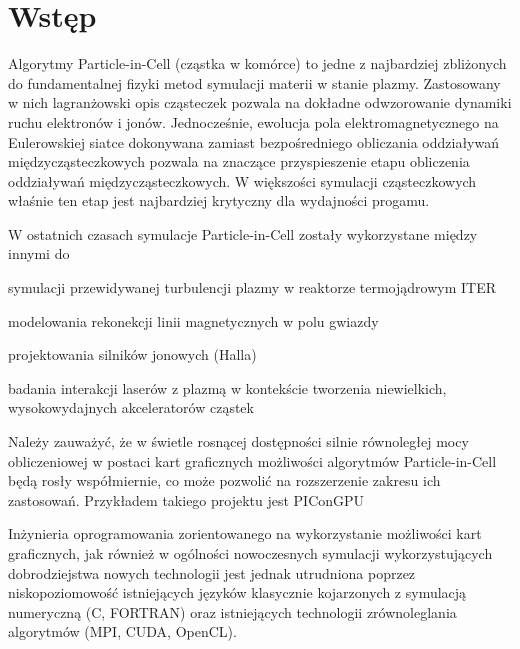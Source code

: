 \newcommand{\code}[1]{\texttt{#1}}

\section[Wstęp]{Wstęp} %
Algorytmy Particle-in-Cell (cząstka w komórce) to jedne z najbardziej zbliżonych do fundamentalnej fizyki
metod symulacji materii w stanie plazmy. Zastosowany w nich lagranżowski opis cząsteczek pozwala na dokładne
odwzorowanie dynamiki ruchu elektronów i jonów. Jednocześnie, ewolucja pola elektromagnetycznego na Eulerowskiej
siatce dokonywana zamiast bezpośredniego obliczania oddziaływań międzycząsteczkowych pozwala na znaczące
przyspieszenie etapu obliczenia oddziaływań międzycząsteczkowych. W większości symulacji cząsteczkowych właśnie
ten etap jest najbardziej krytyczny dla wydajności progamu.

W ostatnich czasach symulacje Particle-in-Cell zostały wykorzystane między innymi do
\item symulacji przewidywanej turbulencji plazmy w reaktorze termojądrowym ITER 
\item modelowania rekonekcji linii magnetycznych w polu gwiazdy 
\item projektowania silników jonowych (Halla) 
\item badania interakcji laserów z plazmą w kontekście tworzenia niewielkich,
    wysokowydajnych akceleratorów cząstek 

    Należy zauważyć, że w świetle rosnącej dostępności silnie równoległej mocy obliczeniowej w postaci kart graficznych
    możliwości algorytmów Particle-in-Cell będą rosły współmiernie, co może pozwolić na rozszerzenie zakresu ich zastosowań.
    Przykładem takiego projektu jest PIConGPU 

    Inżynieria oprogramowania zorientowanego na wykorzystanie możliwości kart graficznych,
    jak również w ogólności nowoczesnych symulacji wykorzystujących dobrodziejstwa nowych technologii
    jest jednak utrudniona poprzez niskopoziomowość istniejących języków klasycznie
    kojarzonych z symulacją numeryczną (C, FORTRAN) oraz istniejących technologii zrównoleglania
    algorytmów (MPI, CUDA, OpenCL).

